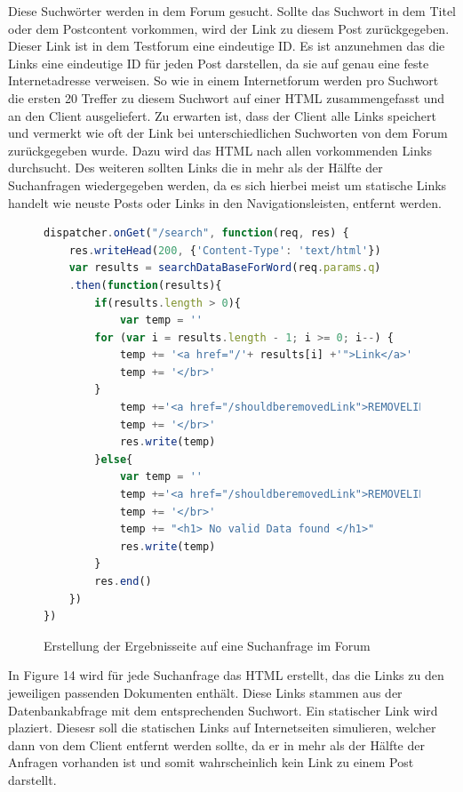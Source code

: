 Diese Suchwörter werden in dem Forum gesucht. Sollte das Suchwort in dem Titel oder dem Postcontent vorkommen, wird der Link zu diesem Post zurückgegeben. Dieser Link ist in dem Testforum eine eindeutige ID. Es ist anzunehmen das die Links eine eindeutige ID für jeden Post darstellen, da sie auf genau eine feste Internetadresse verweisen. So wie in einem Internetforum werden pro Suchwort die ersten 20 Treffer zu diesem Suchwort auf einer HTML zusammengefasst und an den Client ausgeliefert. Zu erwarten ist, dass der Client alle Links speichert und vermerkt wie oft der Link bei unterschiedlichen Suchworten von dem Forum zurückgegeben wurde. Dazu wird das HTML nach allen vorkommenden Links durchsucht. Des weiteren sollten Links die in mehr als der Hälfte der Suchanfragen wiedergegeben werden, da es sich hierbei meist um statische Links handelt wie neuste Posts oder Links in den Navigationsleisten, entfernt werden.
\newpage

\begin{figure}[h!]
\begin{lstlisting}[language=JavaScript]
dispatcher.onGet("/search", function(req, res) {
    res.writeHead(200, {'Content-Type': 'text/html'})
    var results = searchDataBaseForWord(req.params.q)
    .then(function(results){
        if(results.length > 0){
            var temp = ''
        for (var i = results.length - 1; i >= 0; i--) {
            temp += '<a href="/'+ results[i] +'">Link</a>'
            temp += '</br>'
        }
            temp +='<a href="/shouldberemovedLink">REMOVELINK</a>'
            temp += '</br>'
            res.write(temp)
        }else{
            var temp = ''
            temp +='<a href="/shouldberemovedLink">REMOVELINK</a>'
            temp += '</br>'
            temp += "<h1> No valid Data found </h1>"
            res.write(temp)
        }
        res.end()    
    })  
})
\end{lstlisting}
\caption{Erstellung der Ergebnisseite auf eine Suchanfrage im Forum}
\end{figure}

In Figure 14 wird für jede Suchanfrage das HTML erstellt, das die Links zu den jeweiligen passenden Dokumenten enthält. Diese Links stammen aus der Datenbankabfrage mit dem entsprechenden Suchwort.
Ein statischer Link wird plaziert. Diesesr soll die statischen Links auf Internetseiten simulieren, welcher dann von dem Client entfernt werden sollte, da er in mehr als der Hälfte der Anfragen vorhanden ist und somit wahrscheinlich kein Link zu einem Post darstellt.

